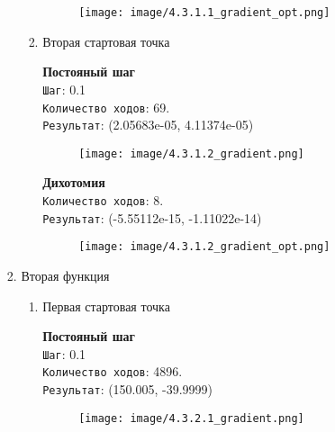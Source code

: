 \documentclass[12pt, a4paper]{article}
\begin{document}
\begin{enumerate}
\begin{enumerate}
\begin{enumerate}
\begin{enumerate}
            \begin{figure}[h]
            \centering
            \texttt{[image: image/4.3.1.1\_gradient\_opt.png]}
            \end{figure}
            
            \item Вторая стартовая точка

            \textbf{Постояный шаг}\\
            \texttt{Шаг}: 0.1\\
            \texttt{Количество ходов}: 69.\\
            \texttt{Результат}: (2.05683e-05, 4.11374e-05)
            
            \begin{figure}[h]
            \centering
            \texttt{[image: image/4.3.1.2\_gradient.png]}
            \end{figure}

            \textbf{Дихотомия}\\
            \texttt{Количество ходов}: 8.\\
            \texttt{Результат}: (-5.55112e-15, -1.11022e-14)
            
            \begin{figure}[h]
            \centering
            \texttt{[image: image/4.3.1.2\_gradient\_opt.png]}
            \end{figure}
            
        \end{enumerate}

        \item Вторая функция

        \begin{enumerate}
            \item Первая стартовая точка
            
            \textbf{Постояный шаг}\\
            \texttt{Шаг}: 0.1\\
            \texttt{Количество ходов}: 4896.\\
            \texttt{Результат}: (150.005, -39.9999)
            
            \begin{figure}[h]
            \centering
            \texttt{[image: image/4.3.2.1\_gradient.png]}
            \end{figure}


\end{enumerate}
\end{enumerate}
\end{enumerate}
\end{enumerate}
\end{document}
